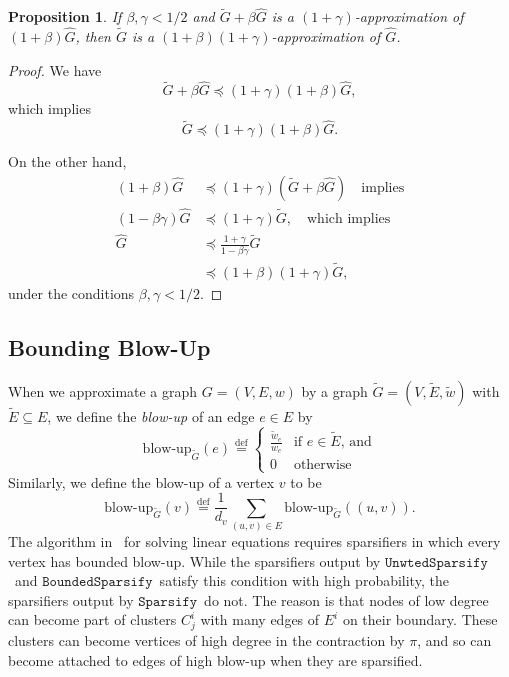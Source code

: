 \documentclass[11pt]{article}
\newtheorem{proposition}[theorem]{Proposition}
\newcommand{\sparsify}{\ensuremath{\mathtt{Sparsify}}}
\newcommand{\unwtedsparsify}{\ensuremath{\mathtt{UnwtedSparsify}}}
\newcommand{\boundedsparsify}{\ensuremath{\mathtt{BoundedSparsify}}}
\def\Gtil{\widetilde{G}}
\def\Etil{\widetilde{E}}
\def\Ghat{\widehat{G}}
\def\wtil{\tilde{w}}
\def\pleq{\preccurlyeq}
\def\defeq{\stackrel{\mathrm{def}}{=}}
\def\pleq{\preccurlyeq}
\def\blowup#1#2{\textrm{blow-up}_{#1}\left( #2 \right)}
\begin{document}
\begin{proposition}\label{pro:sparsifyCalc}
If $\beta , \gamma < 1/2$ and
 $\Gtil + \beta \Ghat $ is a $(1+\gamma)$-approximation of $(1+\beta) \Ghat $,
  then
$\Gtil$ is a $(1+\beta) (1+\gamma )$-approximation of $\Ghat $.
\end{proposition}
\begin{proof}
We have
\[
  \Gtil + \beta \Ghat  \pleq (1+\gamma) (1+ \beta) \Ghat ,
\]
which implies
\[
  \Gtil  \pleq (1+\gamma) (1+ \beta) \Ghat .
\]


On the other hand,
\begin{align*}
 (1+ \beta) \Ghat
& \pleq
  (1+\gamma) \left(\Gtil + \beta \Ghat  \right) \quad \text{implies}
\\
(1 - \beta \gamma) \Ghat
 & \pleq
(1+ \gamma) \Gtil , \quad \text{which implies}
\\
\Ghat
 & \pleq
\frac{1+\gamma}{1 - \beta \gamma } \Gtil
\\
&  \pleq
 (1 + \beta) (1 + \gamma ) \Gtil,
\end{align*}
under the conditions $\beta , \gamma < 1/2$.
\end{proof}


\subsection{Bounding Blow-Up}\label{ssec:blowup}
When we approximate a graph $G = (V,E,w)$ by a graph
  $\Gtil = (V, \Etil , \wtil)$ with $\Etil \subseteq E$,
  we define the \textit{blow-up} of an edge $e \in E$
  by
\[
 \blowup{\Gtil }{e} \defeq
\begin{cases}
 \frac{\wtil_{e}}{w_{e}}  & \text{if $e \in \Etil $, and}\\
0 & \text{otherwise}
\end{cases}
\]
Similarly, we define the blow-up of a vertex $v$ to be
\[
  \blowup{\Gtil }{v} \defeq
  \frac{1}{d_{v}} \sum_{(u,v) \in E} \blowup{\Gtil }{(u,v)}.
\]
The algorithm in~\cite{SpielmanTengLinsolve} for solving linear equations
  requires sparsifiers in which every vertex has bounded blow-up.
While the sparsifiers output by \unwtedsparsify \ and \boundedsparsify \
  satisfy this condition with high probability,
  the sparsifiers output by \sparsify  \ do not.
The reason is that nodes of low degree can become part of clusters
  $C^{i}_{j}$ with many edges of $E^{i}$ on their boundary.
These clusters can become vertices of high degree in the contraction by $\pi$,
  and so can become attached to edges of high blow-up when they are sparsified.
\end{document}
